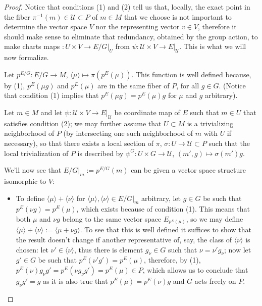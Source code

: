 \begin{proof}
Notice that conditions (1) and (2) tell us that, locally, the exact point in the fiber $\pi^{-1}(m) \in \mathcal U \subset P$ of $m \in M$ that we choose is not important to determine the vector space $V$ nor the representing vector $v \in V$, therefore it should make sense to eliminate that redundancy, obtained by the group action, to make charts maps $:U \times V \to E/G|_U$ from $\psi:\mathcal U \times V \to E|_{\mathcal U}$. This is what we will now formalize.

Let $p^{E/G}: E/G \to M$, $\langle \mu \rangle \mapsto \pi(p^E(\mu))$. This function is well defined because, by (1), $p^E(\mu g)$ and $p^E(\mu)$ are in the same fiber of $P$, for all $g \in G$. (Notice that condition (1) implies that $p^E(\mu g) = p^E(\mu) g$ for $\mu$ and $g$ arbitrary).

Let $m \in M$ and let $\psi: \mathcal U \times V \to E|_{\mathcal U}$ be coordinate map of $E$  such that $m \in U$ that satisfies condition (2); we may further assume that $U \subset M$ is a trivializing neighborhood of $P$ (by intersecting one such neighborhood of $m$ with $U$ if necessary), so that there exists a local section of $\pi$, $\sigma: U \to \mathcal U \subset P$ such that the local trivialization of $P$ is described by $\psi^G: U\times G \to \mathcal U$, $(m', g) \mapsto \sigma(m')g$.

We'll now see that $E/G|_m := p^{E/G}(m)$ can be given a vector space structure isomorphic to $V$:
\begin{itemize}
    \item To define $\langle \mu \rangle + \langle \nu \rangle$ for $\langle \mu \rangle, \langle \nu \rangle \in E/G|_m$ arbitrary, let $g \in G$ be such that $p^E(\nu g) = p^E(\mu)$, which exists because of condition (1). This means that both $\mu$ and $\nu g$ belong to the same vector space $E_{p^E(\mu)}$, so we may define $\langle \mu \rangle + \langle \nu \rangle := \langle \mu + \nu g \rangle$. To see that this is well defined it suffices to show that the result doesn't change if another representative of, say, the class of $\langle \nu \rangle$ is chosen: let $\nu' \in \langle \nu \rangle$, thus there is element $g_\nu \in G$ such that $\nu = \nu' g_\nu$; now let $g' \in G$ be such that $p^E(\nu' g') = p^E(\mu)$, therefore, by (1), $p^E(\nu) g_\nu g' = p^E(\nu g_\nu g') = p^E(\mu) \in P$, which allows us to conclude that $g_\nu g' = g$ as it is also true that $p^E(\mu) = p^E(\nu)g$ and $G$ acts freely on $P$.
    

\end{itemize}
\end{proof}
